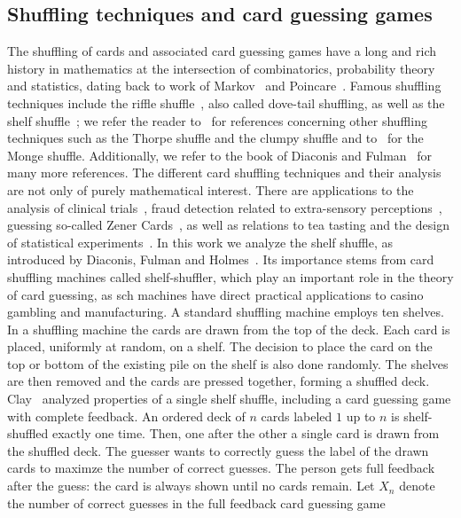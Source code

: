 \documentclass[10pt,reqno,a4paper]{amsart}
\theoremstyle{definition}
\begin{document}
\subsection{Shuffling techniques and card guessing games}
The shuffling of cards and associated card guessing games 
have a long and rich history in mathematics at the intersection of combinatorics, probability theory and statistics,  
dating back to work of Markov~\cite{Markov} and Poincare~\cite{Poincare}. Famous shuffling techniques include the riffle shuffle~\cite{BayerDiaconis,DiaconisGraham1981,Gilbert1955}, also called dove-tail shuffling, as well as the shelf shuffle~\cite{Clay2025a,Clay2025b}; we refer the reader to~\cite{Sellke} for references concerning other shuffling techniques such as the Thorpe shuffle and the clumpy shuffle and to~\cite{Kraitchik1942Recreations} for the Monge shuffle. Additionally, we refer to the book of Diaconis and Fulman~\cite{DiaconisFulman2023Shuffling} for many more references. 
The different card shuffling techniques and their analysis are not only of purely mathematical interest. There are applications to the analysis of clinical trials~\cite{BlackwellHodges1957,Efron1971}, fraud detection related to extra-sensory perceptions~\cite{Diaconis1978}, guessing so-called Zener Cards~\cite{OttoliniSteiner2023}, as well as relations to tea tasting and the design of statistical experiments~\cite{Fisher1936,OT2024}. In this work we analyze the shelf shuffle, as introduced by Diaconis, Fulman and Holmes~\cite{DiaconisFulmanHolmes2013}.
Its importance stems from card shuffling machines called shelf-shuffler, which play an important role in the theory of card guessing,
as sch machines have direct practical applications to casino gambling and manufacturing. A standard shuffling machine employs ten shelves. In a shuffling machine the cards are drawn from the top of the deck. Each card is placed, uniformly at random, on a shelf. The decision to place the card
on the top or bottom of the existing pile on the shelf is also done randomly. The shelves
are then removed and the cards are pressed together, forming a shuffled deck. 
Clay~\cite{Clay2025a} analyzed properties of a single shelf shuffle, including a card guessing game with complete feedback.
An ordered deck of $n$ cards labeled $1$ up to $n$ is shelf-shuffled exactly one time.
Then, one after the other a single card is drawn from the shuffled deck. The guesser wants to correctly guess the label of the drawn cards to maximze the number of correct guesses. 
The person gets full feedback after the guess: the card is always shown until no cards remain. Let $X_n$ denote the number of correct guesses in the full feedback card guessing game
\end{document}
